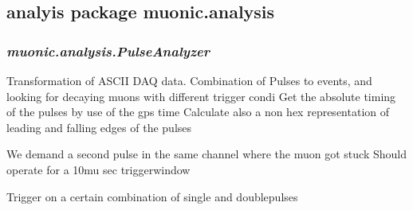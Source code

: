 \documentclass[letterpaper,10pt,english]{sphinxmanual}
\begin{document}
\subsection{analyis package muonic.analysis}
\label{muonic:module-muonic.analysis}\label{muonic:analyis-package-muonic-analysis}

\subsubsection{\emph{muonic.analysis.PulseAnalyzer}}
\label{muonic:muonic-analysis-pulseanalyzer}
Transformation of ASCII DAQ data. Combination of Pulses to events, and looking for decaying muons with different trigger condi
\label{muonic:module-muonic.analysis.PulseAnalyzer}
Get the absolute timing of the pulses
by use of the gps time
Calculate also a non hex representation of
leading and falling edges of the pulses

\begin{fulllineitems}
\label{muonic:muonic.analysis.PulseAnalyzer.DecayTriggerThorough}
We demand a second pulse in the same channel where the muon got stuck
Should operate for a 10mu sec triggerwindow

\begin{fulllineitems}
\label{muonic:muonic.analysis.PulseAnalyzer.DecayTriggerThorough.trigger}
Trigger on a certain combination of single and doublepulses

\end{fulllineitems}


\end{fulllineitems}

\end{document}
